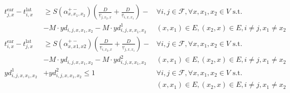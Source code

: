 \documentclass[../../thesis.tex]{subfiles}
\begin{document}
\begin{align}
    t^\text{ear}_{j,x}-t^\text{lat}_{i,x}&\geq S(\alpha^{+-}_{x,x_1,x_2})\left(\frac D{\underline v_{j,x_2,x}} 
    + \frac D{\underline v_{i,x,x_1}}\right)-
    &\forall i,j\in\mathcal F,\forall x,x_1,x_2\in V \text { s.t. }
    \nonumber\\
    &- M\cdot yd_{i,j,x,x_1,x_2}- M\cdot yd^1_{i,j,x,x_1,x_2} 
    & (x,x_1)\in E,(x_2,x)\in E, i\neq j, x_1\neq x_2\\
    t^\text{ear}_{i,x}-t^\text{lat}_{j,x}&\geq S(\alpha^{+-}_{x,x1,x2})\left(\frac D{\underline v_{i,x_2,x}}+
    \frac D{\underline v_{j,x,x_1}}\right)- 
    &\forall i,j\in\mathcal F,\forall x,x_1,x_2\in V \text { s.t. }
    \nonumber\\
    &- M\cdot yd_{i,j,x,x_1,x_2}- M\cdot yd^2_{i,j,x,x_1,x_2}
    &(x,x_1)\in E,(x_2,x)\in E, i\neq j, x_1\neq x_2\\
    yd^1_{i,j,x,x_1,x_2} &+ yd^2_{i,j,x,x_1,x_2}\leq 1&
    \forall i,j\in\mathcal F,\forall x,x_1,x_2\in V\text { s.t. }
    \nonumber\\&& (x,x_1)\in E,(x_2,x)\in E, i\neq j, x_1\neq x_2
\end{align}
\end{document}
